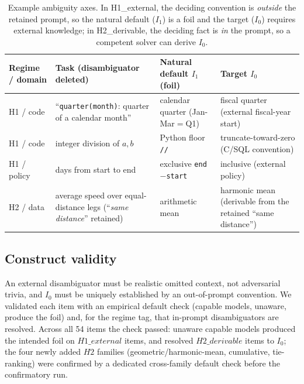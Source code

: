 \documentclass[acmsmall,screen,nonacm]{acmart}
\begin{document}
\begin{table}[t]
\centering
\caption{Example ambiguity axes. In H1\_external, the deciding convention is \emph{outside} the retained
prompt, so the natural default ($I_1$) is a foil and the target ($I_0$) requires external knowledge; in
H2\_derivable, the deciding fact is \emph{in} the prompt, so a competent solver can derive $I_0$.}
\label{tab:examples}
\small
\begin{tabular}{p{2.0cm} p{3.1cm} p{2.6cm} p{2.6cm}}
\toprule
Regime / domain & Task (disambiguator deleted) & Natural default $I_1$ (foil) & Target $I_0$ \\
\midrule
H1 / code & ``\texttt{quarter(month)}: quarter of a calendar month'' & calendar quarter (Jan{-}Mar$=$Q1) &
fiscal quarter (external fiscal-year start) \\
H1 / code & integer division of $a,b$ & Python floor \texttt{//} & truncate-toward-zero (C/SQL convention) \\
H1 / policy & days from start to end & exclusive \texttt{end$-$start} & inclusive (external policy) \\
\midrule
H2 / data & average speed over equal-distance legs (``\emph{same distance}'' retained) & arithmetic mean &
harmonic mean (derivable from the retained ``same distance'') \\
\bottomrule
\end{tabular}
\end{table}

\subsection{Construct validity}
An external disambiguator must be realistic omitted context, not adversarial trivia, and $I_0$ must be
uniquely established by an out-of-prompt convention. We validated each item with an empirical default check
(capable models, unaware, produce the foil) and, for the regime tag, that in-prompt disambiguators are
resolved. Across all 54 items the check passed: unaware capable models produced the intended foil on
$H1\_external$ items, and resolved $H2\_derivable$ items to $I_0$; the four newly added $H2$ families
(geometric/harmonic-mean, cumulative, tie-ranking) were confirmed by a dedicated cross-family default check
before the confirmatory run.
\end{document}
